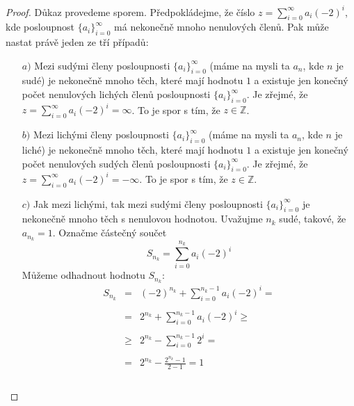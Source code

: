 \documentclass[czech,bachelor,dept470,male]{diploma}
\newcommand{\posla}{\{a_i\}_{i=0}^{\infty}}
\begin{document}
\begin{proof}
	Důkaz provedeme sporem. Předpokládejme, že číslo $z=\sum_{i=0}^{\infty}a_i(-2)^i$, kde posloupnost $\posla$ má nekonečně mnoho nenulových členů. Pak může nastat právě jeden ze tří případů:
	\begin{itemize}
		\item[$a)$]
		      Mezi sudými členy posloupnosti $\posla$ (máme na mysli ta $a_n$, kde $n$ je sudé) je nekonečně mnoho
		      těch, které mají hodnotu $1$ a existuje jen konečný počet nenulových lichých členů posloupnosti $\posla$.
		      Je zřejmé, že $z = \sum_{i=0}^{\infty}a_i(-2)^i = \infty$. To je spor s tím, že $z \in \mathbb{Z}$.
		\item[$b)$] Mezi lichými členy posloupnosti $\posla$ (máme na mysli ta $a_n$, kde $n$ je liché) je nekonečně mnoho
		      těch, které mají hodnotu $1$ a existuje jen konečný počet nenulových sudých členů posloupnosti $\posla$.
		      Je zřejmé, že $z = \sum_{i=0}^{\infty}a_i(-2)^i = -\infty$. To je spor s tím, že $z \in \mathbb{Z}$.

		\item[$c)$] Jak mezi lichými, tak mezi sudými členy posloupnosti $\posla$ je nekonečně mnoho těch s nenulovou
		      hodnotou.
		      Uvažujme $n_k$ sudé, takové, že $a_{n_k} = 1$. Označme částečný součet
		      $$S_{n_k} = \sum_{i=0}^{n_k}a_i(-2)^i$$
		      Můžeme odhadnout hodnotu $S_{n_k}$:
		      \begin{equation}\label{NBe6}
			      \begin{array}{rcl}
				      S_{n_k} & =    & (-2)^{n_k} + \sum_{i=0}^{n_k-1}a_i(-2)^i =           \\
				              &      &                                                      \\
				              & =    & 2^{n_k} + \sum_{i=0}^{n_k-1}a_i(-2)^i \geq           \\
				              &      &                                                      \\
				              & \geq & 2^{n_k} - \sum_{i=0}^{n_k-1}2^i =                    \\
				              &      &                                                      \\
				              & =    & \displaystyle{2^{n_k} - \frac{2^{n_k} - 1}{2-1} = 1} \\
				              &      &                                                      \\
			      \end{array}
		      \end{equation}


\end{itemize}
\end{proof}
\end{document}
